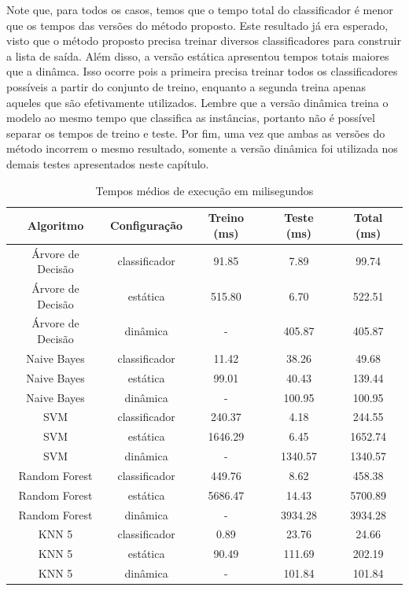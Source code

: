 Note que, para todos os casos, temos que o tempo total do classificador é menor que os tempos das versões do método proposto.
Este resultado já era esperado, visto que o método proposto precisa treinar diversos classificadores para construir a lista de saída.
Além disso, a versão estática apresentou tempos totais maiores que a dinâmca.
Isso ocorre pois a primeira precisa treinar todos os classificadores possíveis a partir do conjunto de treino, enquanto a segunda treina apenas aqueles que são efetivamente utilizados.
Lembre que a versão dinâmica treina o modelo ao mesmo tempo que classifica as instâncias, portanto não é possível separar os tempos de treino e teste.
Por fim, uma vez que ambas as versões do método incorrem o mesmo resultado, somente a versão dinâmica foi utilizada nos demais testes apresentados neste capítulo.

\begin{table}[h!]
  \begin{center}
    \begin{tabular}{ccccc}
      \hline
      \textbf{Algoritmo} & \textbf{Configuração} & \textbf{Treino (ms)} & \textbf{Teste (ms)} & \textbf{Total (ms)}\\
      \hline

      Árvore de Decisão & classificador & 91.85 & 7.89 & 99.74\\
      Árvore de Decisão & estática & 515.80 & 6.70 & 522.51\\
      Árvore de Decisão & dinâmica & - & 405.87 & 405.87\\
      Naive Bayes &  classificador & 11.42 & 38.26 & 49.68\\
      Naive Bayes &  estática & 99.01 & 40.43 & 139.44\\
      Naive Bayes &  dinâmica & - & 100.95 & 100.95\\
      SVM & classificador & 240.37 & 4.18 & 244.55\\
      SVM & estática & 1646.29 & 6.45 & 1652.74\\
      SVM & dinâmica & - & 1340.57 & 1340.57\\
      Random Forest &  classificador & 449.76 & 8.62 & 458.38\\
      Random Forest &  estática & 5686.47 & 14.43 & 5700.89\\
      Random Forest &  dinâmica & - & 3934.28 & 3934.28\\
      KNN 5 & classificador & 0.89 & 23.76 & 24.66\\
      KNN 5 & estática  & 90.49 & 111.69  & 202.19\\
      KNN 5 & dinâmica  & - & 101.84 & 101.84\\


      \hline
    \end{tabular}
    \caption{Tempos médios de execução em milisegundos}
    \label{tab:tempostestes}
  \end{center}
\end{table}

